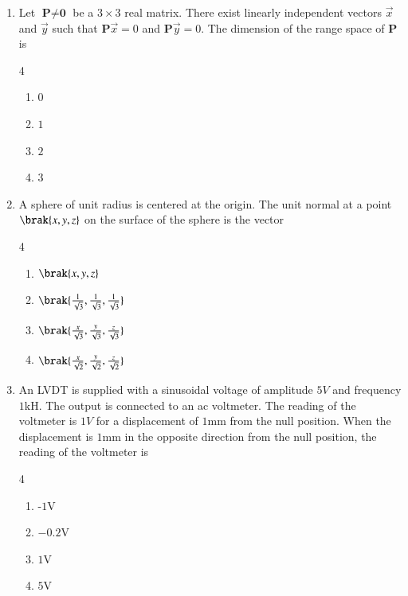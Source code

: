 \documentclass[journal,12pt,onecolumn]{IEEEtran}
\theoremstyle{remark}
\begin{document}
\begin{enumerate}
\vspace{0.5 cm}
\item Let  $\textbf{P} \not= \textbf{0}$ be a $3 \times 3$ real matrix. There exist linearly independent vectors $\Vec{x}$ and $\Vec{y}$ such that $\textbf{P}\vec{x} = 0$ and $\textbf{P}\vec{y} = 0$. The dimension of the range space of \textbf{P} is \par \hfill{}
\begin{multicols}{4}
    \begin{enumerate}
        \item $0$
        \item $1$
        \item $2$
        \item $3$
\end{enumerate}
\end{multicols}
\vspace{0.5 cm}
\item A sphere of unit radius is centered at the origin. The unit normal at a point $\brak{x,y,z}$ on the surface of the sphere is the vector \par \hfill{}
\begin{multicols}{4}
    \begin{enumerate}
        \item $\brak{x,y,z}$
        \item $\brak{\frac{1}{\sqrt{3}},\frac{1}{\sqrt{3}},\frac{1}{\sqrt{3}}}$
        \item $\brak{\frac{x}{\sqrt{3}},\frac{y}{\sqrt{3}},\frac{z}{\sqrt{3}}}$
        \item $\brak{\frac{x}{\sqrt{2}},\frac{y}{\sqrt{2}},\frac{z}{\sqrt{2}}}$
\end{enumerate}
\end{multicols}


\vspace{0.5cm}
\item An LVDT is supplied with a sinusoidal voltage of amplitude $5V$ and frequency $1\text{kH}$. The output is connected to an ac voltmeter. The reading of the voltmeter is $1V$ for a displacement of $1\text{mm}$ from the null position. When the displacement is $1\text{mm}$ in the opposite direction from the null position, the reading of the voltmeter is \par \hfill{}
\begin{multicols}{4}
    \begin{enumerate}
        \item -$1\text{V}$
        \item $-0.2\text{V}$
        \item $1\text{V}$
        \item $5\text{V}$
\end{enumerate}
\end{multicols}


\end{enumerate}
\end{document}
